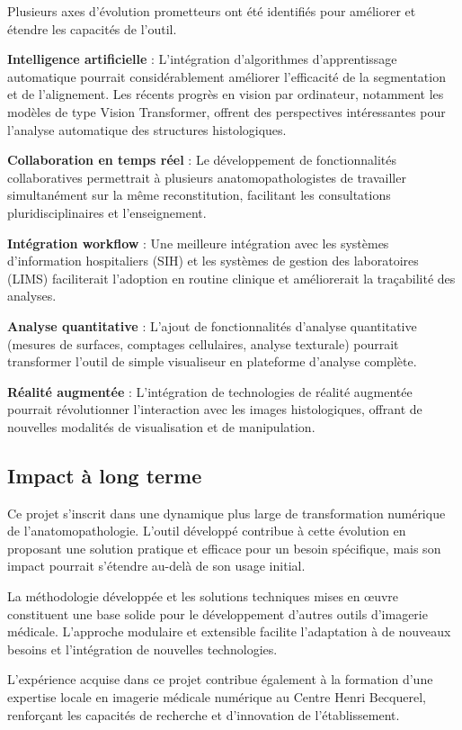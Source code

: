 \documentclass[12pt,a4paper]{report}
\begin{document}
Plusieurs axes d'évolution prometteurs ont été identifiés pour améliorer et étendre les capacités de l'outil.

\textbf{Intelligence artificielle} : L'intégration d'algorithmes d'apprentissage automatique pourrait considérablement améliorer l'efficacité de la segmentation et de l'alignement. Les récents progrès en vision par ordinateur, notamment les modèles de type Vision Transformer, offrent des perspectives intéressantes pour l'analyse automatique des structures histologiques.

\textbf{Collaboration en temps réel} : Le développement de fonctionnalités collaboratives permettrait à plusieurs anatomopathologistes de travailler simultanément sur la même reconstitution, facilitant les consultations pluridisciplinaires et l'enseignement.

\textbf{Intégration workflow} : Une meilleure intégration avec les systèmes d'information hospitaliers (SIH) et les systèmes de gestion des laboratoires (LIMS) faciliterait l'adoption en routine clinique et améliorerait la traçabilité des analyses.

\textbf{Analyse quantitative} : L'ajout de fonctionnalités d'analyse quantitative (mesures de surfaces, comptages cellulaires, analyse texturale) pourrait transformer l'outil de simple visualiseur en plateforme d'analyse complète.

\textbf{Réalité augmentée} : L'intégration de technologies de réalité augmentée pourrait révolutionner l'interaction avec les images histologiques, offrant de nouvelles modalités de visualisation et de manipulation.

\subsection{Impact à long terme}

Ce projet s'inscrit dans une dynamique plus large de transformation numérique de l'anatomopathologie. L'outil développé contribue à cette évolution en proposant une solution pratique et efficace pour un besoin spécifique, mais son impact pourrait s'étendre au-delà de son usage initial.

La méthodologie développée et les solutions techniques mises en œuvre constituent une base solide pour le développement d'autres outils d'imagerie médicale. L'approche modulaire et extensible facilite l'adaptation à de nouveaux besoins et l'intégration de nouvelles technologies.

L'expérience acquise dans ce projet contribue également à la formation d'une expertise locale en imagerie médicale numérique au Centre Henri Becquerel, renforçant les capacités de recherche et d'innovation de l'établissement.
\end{document}

